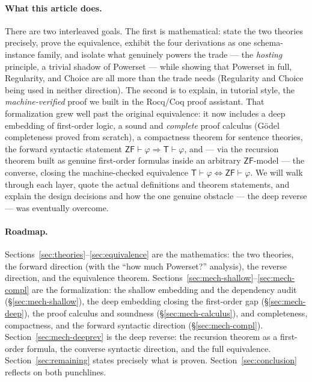 \documentclass[11pt]{article}
\theoremstyle{plain}
\theoremstyle{definition}
\newcommand{\ZF}{\mathsf{ZF}}
\renewcommand{\ZF}{\textsf{ZF}}
\newcommand{\T}{\textsf{T}}
\newcommand{\proves}{\vdash}
\begin{document}
\paragraph{What this article does.} There are two interleaved goals. The first is
mathematical: state the two theories precisely, prove the equivalence, exhibit the
four derivations as one schema-instance family, and isolate what genuinely powers
the trade --- the \emph{hosting} principle, a trivial shadow of Powerset --- while
showing that Powerset in full, Regularity, and Choice are all more than the trade
needs (Regularity and Choice being used in neither direction). The second is
to explain, in tutorial style, the
\emph{machine-verified} proof we built in the Rocq/Coq proof assistant. That
formalization grew well past the original equivalence: it now includes a deep
embedding of first-order logic, a sound and \emph{complete} proof calculus
(G\"odel completeness proved from scratch), a compactness theorem for sentence
theories, the forward syntactic statement
$\ZF \proves \varphi \Rightarrow \T \proves \varphi$, and --- via the recursion
theorem built as genuine first-order formulas inside an arbitrary $\ZF$-model ---
the converse, closing the machine-checked equivalence
$\T \proves \varphi \Leftrightarrow \ZF \proves \varphi$. We will walk through
each layer, quote the actual definitions and theorem statements, and explain the
design decisions and how the one genuine obstacle --- the deep reverse --- was
eventually overcome.

\paragraph{Roadmap.}
Sections~\ref{sec:theories}--\ref{sec:equivalence} are the mathematics: the two
theories, the forward direction (with the ``how much Powerset?'' analysis), the
reverse direction,
and the equivalence theorem. Sections~\ref{sec:mech-shallow}--\ref{sec:mech-compl}
are the formalization: the shallow embedding and the dependency audit
(\S\ref{sec:mech-shallow}), the deep embedding closing the first-order gap
(\S\ref{sec:mech-deep}), the proof calculus and soundness
(\S\ref{sec:mech-calculus}), and completeness, compactness, and the forward
syntactic direction (\S\ref{sec:mech-compl}). Section~\ref{sec:mech-deeprev} is
the deep reverse: the recursion theorem as a first-order formula, the converse
syntactic direction, and the full equivalence. Section~\ref{sec:remaining} states
precisely what is proven. Section~\ref{sec:conclusion} reflects on both
punchlines.
\end{document}
